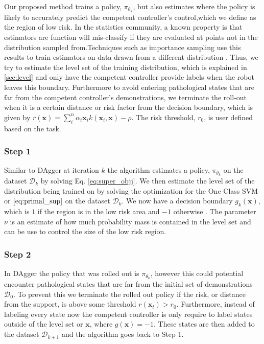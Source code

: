\documentclass[10pt, conference]{ieeeconf}      %
\newcommand{\bx}{\mathbf{x}}
\begin{document}
Our proposed method trains a policy, $\pi_{\theta_k}$, but also estimates where the policy is likely to accurately predict the competent controller's control,which we define as the region of low risk.  In the statistics community, a known property is that estimators are function will mis-classify if they are evaluated at points not in the distribution sampled from.Techniques such as importance sampling use this results to train estimators on data drawn from a different distribution \cite{tokdar2010importance}.  Thus, we try to estimate the level set of the training distribution, which is explained in \ref{sec:level} and only have the competent controller provide labels when the robot leaves this boundary. Furthermore to avoid entering pathological states that are far from the competent controller's demonstrations, we terminate the roll-out when it is a certain distance or risk factor from the decision boundary, which is given by $r(\bx) = \sum_i^n \alpha_i \bx_i k(\bx_i,\bx)-\rho$. The risk threshold, $r_0$, is user defined based on the task. 

\subsubsection{Step 1}
Similar to DAgger at iteration $k$ the algorithm estimates a policy, $\pi_{\theta_k}$ on the dataset $\mathcal{D}_k$ by solving Eq. \ref{eq:super_objj}. We then estimate the level set of the distribution being trained on by solving the optimization for the One Class SVM or $\ref{eq:primal_sup}$ on the dataset $\mathcal{D}_k$. We now have a decision boundary $g_k(\bx)$, which is $1$ if the region is in the low risk area and $-1$ otherwise . The parameter $\nu$ is an estimate of how much probability mass is contained in the level set and can be use to control the size of the low risk region. 
 
 
 \subsubsection{Step 2}
 In DAgger the policy that was rolled out is $\pi_{\theta_k}$, however this could potential encounter pathological states that are far from the initial set of demonstrations $\mathcal{D}_0$. To prevent this we terminate the rolled out policy if the risk, or distance from the support, is above some threshold $r(\bx_t) > r_0$.  Furthermore, instead of labeling every state now the competent controller is only require to label states outside of the level set or $\bx$, where $g(\bx) = -1$.  These states are then added to the dataset $\mathcal{D}_{k+1}$ and the algorithm goes back to Step 1. 
\end{document}

